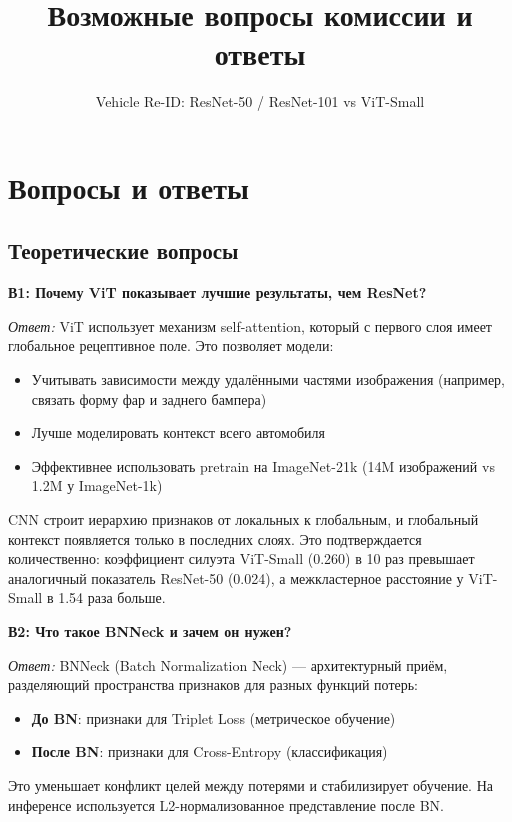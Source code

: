 \documentclass[a4paper, 12pt]{article}
\title{Возможные вопросы комиссии и ответы}
\author{Vehicle Re-ID: ResNet-50 / ResNet-101 vs ViT-Small}
\date{}
\begin{document}
\maketitle

\section*{Вопросы и ответы}

\subsection*{Теоретические вопросы}

\textbf{В1: Почему ViT показывает лучшие результаты, чем ResNet?}

\textit{Ответ:} ViT использует механизм self-attention, который с первого слоя имеет глобальное рецептивное поле. Это позволяет модели:
\begin{itemize}
  \item Учитывать зависимости между удалёнными частями изображения (например, связать форму фар и заднего бампера)
  \item Лучше моделировать контекст всего автомобиля
  \item Эффективнее использовать pretrain на ImageNet-21k (14M изображений vs 1.2M у ImageNet-1k)
\end{itemize}
CNN строит иерархию признаков от локальных к глобальным, и глобальный контекст появляется только в последних слоях. Это подтверждается количественно: коэффициент силуэта ViT-Small (0.260) в 10 раз превышает аналогичный показатель ResNet-50 (0.024), а межкластерное расстояние у ViT-Small в 1.54 раза больше.

\vspace{1em}
\textbf{В2: Что такое BNNeck и зачем он нужен?}

\textit{Ответ:} BNNeck (Batch Normalization Neck) --- архитектурный приём, разделяющий пространства признаков для разных функций потерь:
\begin{itemize}
  \item \textbf{До BN}: признаки для Triplet Loss (метрическое обучение)
  \item \textbf{После BN}: признаки для Cross-Entropy (классификация)
\end{itemize}
Это уменьшает конфликт целей между потерями и стабилизирует обучение. На инференсе используется L2-нормализованное представление после BN.
\end{document}
